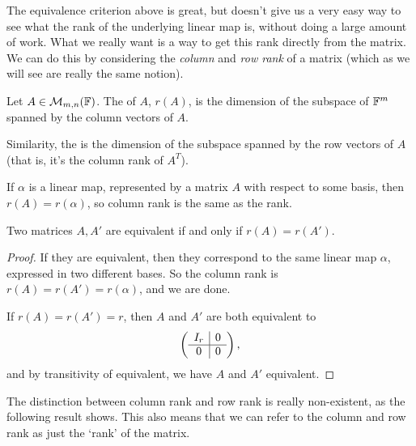 \documentclass[a4paper]{scrartcl}
\begin{document}
The equivalence criterion above is great, but doesn't give us a very easy way to see what the rank of the underlying linear map is, without doing a large amount of work. What we really want is a way to get this rank directly from the matrix. We can do this by considering the \emph{column} and \emph{row rank} of a matrix (which as we will see are really the same notion).

\begin{definition}
    Let $A \in \mathcal{M}_{m, n}(\mathbb{F})$. The  of $A$, $r(A)$, is the dimension of the subspace of $\mathbb{F}^m$ spanned by the column vectors of $A$.

    Similarity, the  is the dimension of the subspace spanned by the row vectors of $A$ (that is, it's the column rank of $A^T$).
\end{definition}

\begin{remark}
    If $\alpha$ is a linear map, represented by a matrix $A$ with respect to some basis, then $r(A) = r(\alpha)$, so column rank is the same as the rank.
\end{remark}

\begin{proposition}
    Two matrices $A, A'$ are equivalent if and only if $r(A) = r(A')$.
\end{proposition}
\begin{proof}
    If they are equivalent, then they correspond to the same linear map $\alpha$, expressed in two different bases. So the column rank is $r(A) = r(A') = r(\alpha)$, and we are done.

    If $r(A) = r(A') = r$, then $A$ and $A'$ are both equivalent to
    $$
    \left(\begin{array}{ c | c }
        I_r & 0 \\
        \hline
        0 & 0
      \end{array}\right),
      $$
      and by transitivity of equivalent, we have $A$ and $A'$ equivalent.
\end{proof}

The distinction between column rank and row rank is really non-existent, as the following result shows. This also means that we can refer to the column and row rank as just the `rank' of the matrix.
\end{document}
